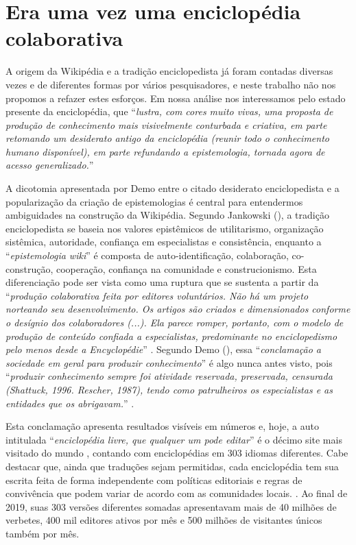 \section{Era uma vez uma enciclopédia colaborativa}

A origem da Wikipédia e a tradição enciclopedista já foram contadas diversas vezes e de diferentes formas por vários pesquisadores, e neste trabalho não nos propomos a refazer estes esforços. Em nossa análise nos interessamos pelo estado presente da enciclopédia, que ``\textit{lustra, com cores muito vivas, uma proposta de produção de conhecimento mais visivelmente conturbada e criativa, em parte retomando um desiderato antigo da enciclopédia (reunir todo o conhecimento humano disponível), em parte refundando a epistemologia, tornada agora de acesso generalizado.}'' \citep{demo_conhecimento_2009}

A dicotomia apresentada por Demo entre o citado desiderato enciclopedista e a popularização da criação de epistemologias é central para entendermos ambiguidades na construção da Wikipédia. Segundo Jankowski (\citeyear{jankowski_wikipedia_2013}), a tradição enciclopedista se baseia nos valores epistêmicos de utilitarismo, organização sistêmica, autoridade, confiança em especialistas e consistência, enquanto a ``\textit{epistemologia wiki}'' é composta de auto-identificação, colaboração, co-construção, cooperação, confiança na comunidade e construcionismo. Esta diferenciação pode ser vista como uma ruptura que se sustenta a partir da ``\textit{produção colaborativa feita por editores voluntários. Não há um projeto norteando seu desenvolvimento. Os artigos são criados e dimensionados conforme o desígnio dos colaboradores (...). Ela parece romper, portanto, com o modelo de produção de conteúdo confiada a especialistas, predominante no enciclopedismo pelo menos desde a Encyclopédie}''  \citep[p.61]{esteves_as_2014}. Segundo Demo (\citeyear{demo_conhecimento_2009}), essa ``\textit{conclamação a sociedade em geral para produzir conhecimento}'' é algo nunca antes visto, pois ``\textit{produzir conhecimento sempre foi atividade reservada, preservada, censurada (Shattuck, 1996. Rescher, 1987), tendo como patrulheiros os especialistas e as entidades que os abrigavam.}'' \citep{demo_conhecimento_2009}.

Esta conclamação apresenta resultados visíveis em números e, hoje, a auto intitulada ``\textit{enciclopédia livre, que qualquer um pode editar}'' é o décimo site mais visitado do mundo \citep{alexa_2019}, contando com enciclopédias em 303 idiomas diferentes. Cabe destacar que, ainda que traduções sejam permitidas, cada enciclopédia tem sua escrita feita de forma independente   com políticas editoriais e regras de convivência que podem variar de acordo com as comunidades locais. \citep{marques_wikipedia_2013}. Ao final de 2019, suas 303 versões diferentes somadas apresentavam mais de 40 milhões de verbetes, 400 mil editores ativos por mês e 500 milhões de visitantes únicos também por mês. \citep{wikimedia_stats_2019}

